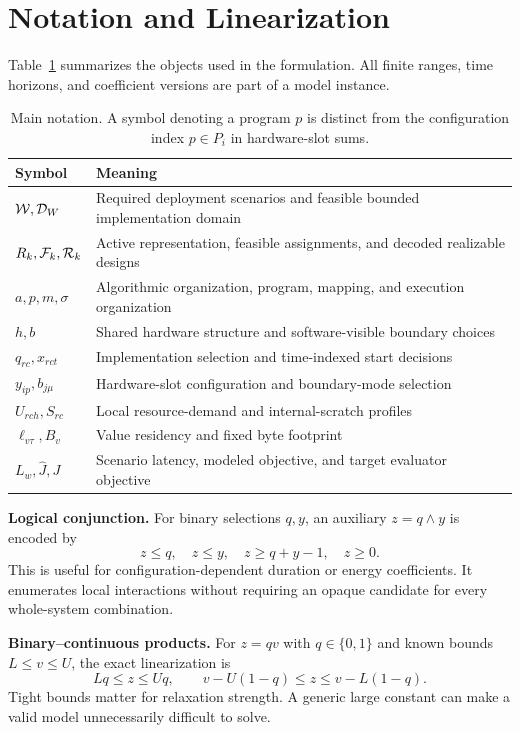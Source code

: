 \section{Notation and Linearization}\label{app:encoding}
Table~\ref{tab:notation} summarizes the objects used in the formulation. All finite ranges, time horizons, and coefficient versions are part of a model instance.

\begin{table}[htbp]
\centering\small
\begin{tabular}{p{.20\linewidth}p{.72\linewidth}}
\toprule
Symbol & Meaning \\
\midrule
$\mathcal W,\mathcal D_W$ & Required deployment scenarios and feasible bounded implementation domain \\
$R_k,\mathcal F_k,\mathcal R_k$ & Active representation, feasible assignments, and decoded realizable designs \\
$a,p,m,\sigma$ & Algorithmic organization, program, mapping, and execution organization \\
$h,b$ & Shared hardware structure and software-visible boundary choices \\
$q_{rc},x_{rct}$ & Implementation selection and time-indexed start decisions \\
$y_{ip},b_{j\mu}$ & Hardware-slot configuration and boundary-mode selection \\
$U_{rch},S_{rc}$ & Local resource-demand and internal-scratch profiles \\
$\ell_{v\tau},B_v$ & Value residency and fixed byte footprint \\
$L_w,\widehat J,J$ & Scenario latency, modeled objective, and target evaluator objective \\
\bottomrule
\end{tabular}
\caption{Main notation. A symbol denoting a program $p$ is distinct from the configuration index $p\in P_i$ in hardware-slot sums.}\label{tab:notation}
\end{table}

\textbf{Logical conjunction.}
For binary selections $q,y$, an auxiliary $z=q\land y$ is encoded by
\begin{equation}
 z\le q,\quad z\le y,\quad z\ge q+y-1,\quad z\ge0.
\end{equation}
This is useful for configuration-dependent duration or energy coefficients. It enumerates local interactions without requiring an opaque candidate for every whole-system combination.

\textbf{Binary--continuous products.}
For $z=qv$ with $q\in\{0,1\}$ and known bounds $L\le v\le U$, the exact linearization is
\begin{equation}
 Lq\le z\le Uq,\qquad v-U(1-q)\le z\le v-L(1-q).
\end{equation}
Tight bounds matter for relaxation strength. A generic large constant can make a valid model unnecessarily difficult to solve.

